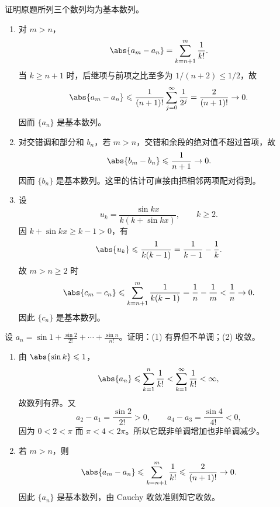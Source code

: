 \begin{xexercise}[3.4.5 练习题 3]
证明原题所列三个数列均为基本数列。
\end{xexercise}
\begin{xsolution}
\begin{enumerate}[label=(\arabic*)]
  \item 对 $m>n$，
  \[
    \abs{a_m-a_n}
    =\sum_{k=n+1}^{m}\frac1{k!}.
  \]
  当 $k\geqslant n+1$ 时，后继项与前项之比至多为 $1/(n+2)\leqslant1/2$，故
  \[
    \abs{a_m-a_n}
    \leqslant\frac1{(n+1)!}\sum_{j=0}^{\infty}\frac1{2^j}
    =\frac2{(n+1)!}\to0.
  \]
  因而 $\{a_n\}$ 是基本数列。

  \item 对交错调和部分和 $b_n$，若 $m>n$，交错和余段的绝对值不超过首项，故
  \[
    \abs{b_m-b_n}\leqslant\frac1{n+1}\to0.
  \]
  因而 $\{b_n\}$ 是基本数列。这里的估计可直接由把相邻两项配对得到。

  \item 设
  \[
    u_k=\frac{\sin kx}{k(k+\sin kx)},\qquad k\geqslant2.
  \]
  因 $k+\sin kx\geqslant k-1>0$，有
  \[
    \abs{u_k}\leqslant\frac1{k(k-1)}
    =\frac1{k-1}-\frac1k.
  \]
  故 $m>n\geqslant2$ 时
  \[
    \abs{c_m-c_n}
    \leqslant\sum_{k=n+1}^{m}\frac1{k(k-1)}
    =\frac1n-\frac1m<\frac1n\to0.
  \]
  因此 $\{c_n\}$ 是基本数列。
\end{enumerate}
\end{xsolution}

\begin{xexercise}[3.4.5 练习题 4]
设 $a_n=\sin1+\frac{\sin2}{2!}+\cdots+\frac{\sin n}{n!}$。证明：(1) 有界但不单调；(2) 收敛。
\end{xexercise}
\begin{xsolution}
\begin{enumerate}[label=(\arabic*)]
  \item 由 $\abs{\sin k}\leqslant1$，
  \[
    \abs{a_n}\leqslant\sum_{k=1}^{n}\frac1{k!}
    <\sum_{k=1}^{\infty}\frac1{k!}<\infty,
  \]
  故数列有界。又
  \[
    a_2-a_1=\frac{\sin2}{2!}>0,
    \qquad
    a_4-a_3=\frac{\sin4}{4!}<0,
  \]
  因为 $0<2<\pi$ 而 $\pi<4<2\pi$。所以它既非单调增加也非单调减少。

  \item 若 $m>n$，则
  \[
    \abs{a_m-a_n}
    \leqslant\sum_{k=n+1}^{m}\frac1{k!}
    \leqslant\frac2{(n+1)!}\to0.
  \]
  因此 $\{a_n\}$ 是基本数列，由 Cauchy 收敛准则知它收敛。
\end{enumerate}
\end{xsolution}

